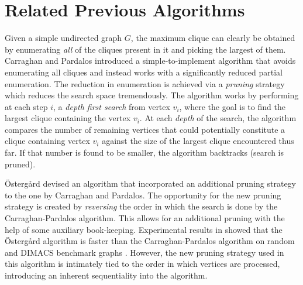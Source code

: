 \section{Related Previous Algorithms}
\label{sec:relatedwork}

Given a simple undirected graph $G$, the maximum clique can clearly be obtained by enumerating 
{\em all} of the cliques present in it and picking the largest of them.
Carraghan and Pardalos \cite{pardalos} introduced a simple-to-implement
algorithm that avoids enumerating all cliques and instead
works with a significantly reduced partial enumeration.
The reduction in enumeration is achieved via 
a {\em pruning} strategy which reduces the search space tremendously.
The algorithm works by
performing at each step $i$, a {\em depth first search} from vertex $v_i$, 
where the goal is to find the largest clique containing the vertex $v_i$.
At each {\em depth} of the search, the algorithm compares the number of remaining
vertices that could potentially constitute a clique containing vertex $v_i$
against the size of the largest clique encountered thus far.
If that number is found to be smaller, the algorithm backtracks (search is pruned).

\"{O}sterg{\aa}rd \cite{ostergard} devised an algorithm that incorporated an additional 
pruning strategy to the one by Carraghan and Pardalos.
The opportunity for the new pruning strategy is created by {\em reversing} the order in which the search is done by
the Carraghan-Pardalos algorithm. This allows for an additional pruning with the help of
some auxiliary book-keeping. 
Experimental results in \cite{ostergard} showed that the \"{O}sterg{\aa}rd
algorithm is faster than the Carraghan-Pardalos algorithm on random and 
DIMACS benchmark graphs \cite{dimacs}.
However, the new pruning strategy used in this algorithm is intimately tied to the order in which vertices are processed, introducing an inherent sequentiality into the algorithm.

